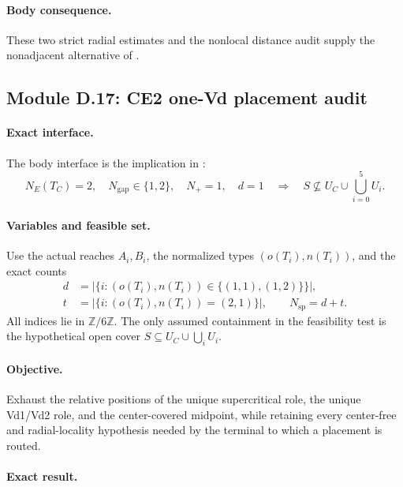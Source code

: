 \paragraph{Body consequence.}
These two strict radial estimates and the nonlocal distance audit supply the
nonadjacent alternative of .

\subsection{Module D.17: CE2 one-Vd placement audit}

\paragraph{Exact interface.}
The body interface is the implication in :
\[
 N_E(T_C)=2,
 \quad N_{\mathrm{gap}}\in\{1,2\},
 \quad N_+=1,
 \quad d=1
 \quad\Longrightarrow\quad
 S\nsubseteq U_C\cup\bigcup_{i=0}^5U_i.
\]

\paragraph{Variables and feasible set.}
Use the actual reaches $A_i,B_i$, the normalized types
$(o(T_i),n(T_i))$, and the exact counts
\[
 \begin{aligned}
 d&=\left|\{i:(o(T_i),n(T_i))\in\{(1,1),(1,2)\}\}\right|,\\
 t&=\left|\{i:(o(T_i),n(T_i))=(2,1)\}\right|,
 \qquad N_{\mathrm{sp}}=d+t.
 \end{aligned}
\]
All indices lie in $\mathbb Z/6\mathbb Z$.  The only assumed containment in
the feasibility test is the hypothetical open cover
$S\subseteq U_C\cup\bigcup_iU_i$.

\paragraph{Objective.}
Exhaust the relative positions of the unique supercritical role, the unique
Vd1/Vd2 role, and the center-covered midpoint, while retaining every
center-free and radial-locality hypothesis needed by the terminal to which a
placement is routed.

\paragraph{Exact result.}

